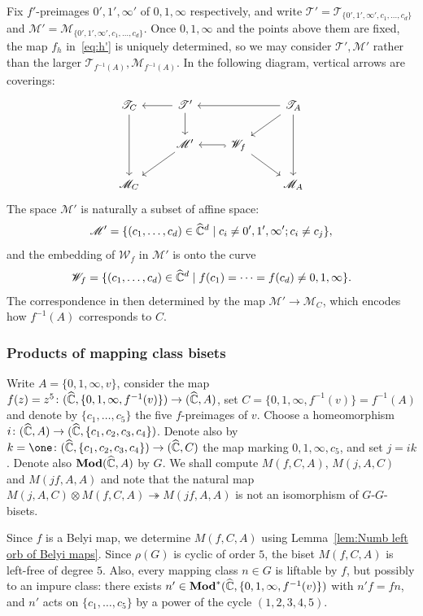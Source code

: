 \documentclass{amsart}
\begin{document}
Fix $f'$-preimages $0',1',\infty'$ of $0,1,\infty$ respectively, and
write $\mathscr T'=\mathscr T_{\{0',1',\infty',c_1,\dots,c_d\}}$ and
$\mathscr M'=\mathscr M_{\{0',1',\infty',c_1,\dots,c_d\}}$. Once
$0,1,\infty$ and the points above them are fixed, the map $f_h$
in~\eqref{eq:h'} is uniquely determined, so we may consider
$\mathscr T',\mathscr M'$ rather than the larger
$\mathscr T_{f^{-1}(A)},\mathscr M_{f^{-1}(A)}$.  In the following
diagram, vertical arrows are coverings:
\begin{equation}\label{eq:diagr:ModCorr}
\begin{tikzcd}
    \mathscr T_C\ar{dd} & \mathscr T'\ar{l}\ar{d} & & \mathscr T_A\ar{ll}\ar{dl}\ar{dd}\\
    & \mathscr M'\ar{dl} & \mathscr W_f\ar[hook]{l}\ar{dr}\\
    \mathscr M_C & & & \mathscr M_A
  \end{tikzcd}
\end{equation}
The space $\mathscr M'$ is naturally a subset of affine space:
\begin{equation}
\label{eq:deef:M'}
\mathscr M'=\{(c_1,\dots,c_d)\in{\widehat{{\mathbb C}}}^d\mid c_i\neq 0',1',\infty';c_i\neq c_j\},\end{equation}
and the embedding of $\mathscr W_f$ in $\mathscr M'$ is onto the curve
\[\mathscr W_f=\{(c_1,\dots,c_d)\in{\widehat{{\mathbb C}}}^d\mid f(c_1)=\cdots=f(c_d)\neq0,1,\infty\}.
\]
The correspondence in then determined by the map
$\mathscr M'\to\mathscr M_C$, which encodes how $f^{-1}(A)$
corresponds to $C$.

\subsubsection{Products of mapping class bisets}\label{ss:TensProd:MappClassBis}
Write $A=\{0,1,\infty,v\}$, consider the map
$f(z)=z^5\colon({\widehat{{\mathbb C}}},\{0,1,\infty,f^{-1}(v)\})\to({\widehat{{\mathbb C}}},A)$, set
$C=\{0,1,\infty,f^{-1}(v)\}=f^{-1}(A)$ and denote by
$\{c_1,\dots,c_5\}$ the five $f$-preimages of $v$. Choose a
homeomorphism $i\colon({\widehat{{\mathbb C}}},A)\to({\widehat{{\mathbb C}}},\{c_1,c_2,c_3,c_4\})$. Denote
also by $k=\one\colon(\hC,\{c_1,c_2,c_3,c_4\})\to(\hC,C)$ the map
marking $0,1,\infty,c_5$, and set $j=i k$. Denote also $\mathbf{\relax Mod}({\widehat{{\mathbb C}}},A)$
by $G$. We shall compute $M(f,C,A)$, $M(j,A,C)$ and $M(j f,A,A)$ and
note that the natural map
$M(j,A,C)\otimes M(f,C,A)\twoheadrightarrow M(j f,A,A)$ is not an
isomorphism of $G$-$G$-bisets.

Since $f$ is a Belyi map, we determine $M(f,C,A)$ using
Lemma~\ref{lem:Numb left orb of Belyi maps}. Since $\rho(G)$ is cyclic
of order $5$, the biset $M(f,C,A)$ is left-free of degree $5$. Also,
every mapping class $n\in G$ is liftable by $f$, but possibly to an
impure class: there exists $n'\in\mathbf{\relax Mod}^*({\widehat{{\mathbb C}}},\{0,1,\infty,f^{-1}(v)\})$
with $n' f=f n$, and $n'$ acts on $\{c_1,\dots,c_5\}$ by a power of
the cycle $(1,2,3,4,5)$.
\end{document}
